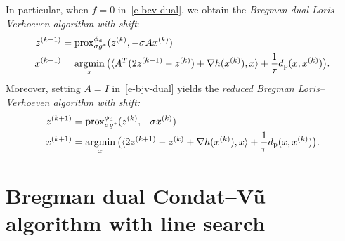 \documentclass[letterpaper,11pt]{article}
\newcommand{\argmin}{\mathop{\rm argmin}}
\newcommand{\prox}{\mathrm{prox}}
\newcommand{\inprod}[2]{\langle#1, #2\rangle}
\newcommand{\primal}{\mathrm p}
\newcommand{\dual}{\mathrm d}
\begin{document}
In particular, when $f=0$ in~\eqref{e-bcv-dual}, we obtain
the \emph{Bregman dual Loris--Verhoeven algorithm with shift}:
\begin{subequations} \label{e-bjv-dual}
\begin{align}
z^{(k+1)} &= \prox_{\sigma g^\ast}^{\phi_\dual}
  (z^{(k)}, -\sigma Ax^{(k)}) \\
x^{(k+1)} &= \argmin_x {\big(
  \inprod{A^T(2z^{(k+1)}-z^{(k)})+\nabla h(x^{(k)})}{x}
  + \frac{1}{\tau} d_\primal(x, x^{(k)})\big)}.
\end{align}
\end{subequations}
Moreover, setting $A=I$ in~\eqref{e-bjv-dual} yields the
\emph{reduced Bregman Loris--Verhoeven algorithm with shift:}
\begin{subequations} \label{e-bspg-dual}
\begin{align}
z^{(k+1)} &= \prox_{\sigma g^\ast}^{\phi_\dual}
  (z^{(k)}, -\sigma x^{(k)} ) \\
  x^{(k+1)} &= \argmin_x{\big(
  \inprod{2z^{(k+1)}-z^{(k)} + \nabla h(x^{(k)})}{x}
  + \frac{1}{\tau} d_\primal(x, x^{(k)})\big)}.
\end{align}
\end{subequations}


\section{Bregman dual Condat--V\~u algorithm with line search}
\label{s-ls}
\end{document}
